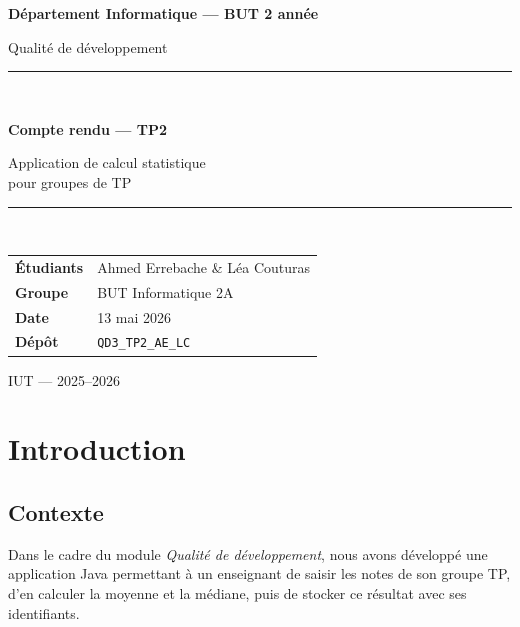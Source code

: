 \documentclass[a4paper,12pt]{article}
\begin{document}

\begin{titlepage}
  \centering
  \vspace*{1.5cm}
  {\Large\bfseries Département Informatique --- BUT 2 année\par}
  \vspace{0.4cm}
  {\large Qualité de développement\par}
  \vspace{2cm}
  \rule{\textwidth}{1.5pt}\\[0.5cm]
  {\Huge\bfseries Compte rendu --- TP2\par}
  \vspace{0.3cm}
  {\Large Application de calcul statistique\\ pour groupes de TP\par}
  \rule{\textwidth}{1.5pt}\\[2cm]
  \begin{tabular}{ll}
    \textbf{Étudiants} & Ahmed Errebache \& Léa Couturas \\
    \textbf{Groupe}    & BUT Informatique 2A             \\
    \textbf{Date}      & 13 mai 2026                     \\
    \textbf{Dépôt}     & \texttt{QD3\_TP2\_AE\_LC}       \\
  \end{tabular}
  \vfill
  {\large IUT --- 2025--2026\par}
\end{titlepage}

\tableofcontents
\newpage

\section{Introduction}

\subsection{Contexte}

Dans le cadre du module \textit{Qualité de développement}, nous avons
développé une application Java permettant à un enseignant de saisir les
notes de son groupe TP, d'en calculer la moyenne et la médiane, puis de
stocker ce résultat avec ses identifiants.
\end{document}
